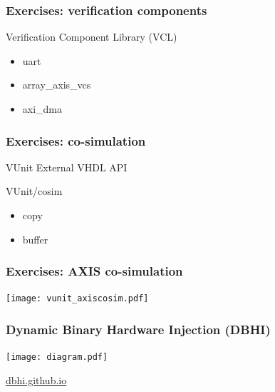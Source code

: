 \documentclass{beamer}
\begin{document}
\begin{frame}
\frametitle{Exercises: verification components}
Verification Component Library (VCL) \href{http://vunit.github.io/verification_components/user_guide.html}{\faBook}
\vspace{1em}
\begin{itemize}
  \item uart
  \href{https://github.com/VUnit/vunit/tree/master/examples/vhdl/uart}{\faCode}
  \vspace{1em}

  \item array\_axis\_vcs
  \href{https://github.com/VUnit/vunit/tree/master/examples/vhdl/array_axis_vcs}{\faCode}
  \vspace{1em}

  \item axi\_dma
  \href{https://github.com/VUnit/vunit/tree/master/examples/vhdl/axi_dma}{\faCode}
\end{itemize}
\end{frame}

\begin{frame}
\frametitle{Exercises: co-simulation}
VUnit External VHDL API \href{http://vunit.github.io/data_types/user_guide.html\#external-vhdl-api}{\faBook}
\vspace{1em}

VUnit/cosim \href{https://vunit.github.io/cosim}{\faBook}
\vspace{1em}
\begin{itemize}
  \item copy
  \href{https://vunit.github.io/cosim/examples/copy.html}{\faBook}
  \href{https://github.com/VUnit/cosim/tree/master/examples/copy}{\faCode}
  \vspace{1em}

  \item buffer
  \href{https://vunit.github.io/cosim/examples/buffer.html}{\faBook}
  \href{https://github.com/VUnit/cosim/tree/master/examples/buffer}{\faCode}
\end{itemize}
\end{frame}

\begin{frame}
\frametitle{Exercises: AXIS co-simulation}
\centering
\texttt{[image: vunit\_axiscosim.pdf]}
\end{frame}

\begin{frame}
\frametitle{Dynamic Binary Hardware Injection (DBHI)}
\centering
\texttt{[image: diagram.pdf]}

\vfill
\Large\href{https://dbhi.github.io/}{dbhi.github.io}
\end{frame}
\end{document}
